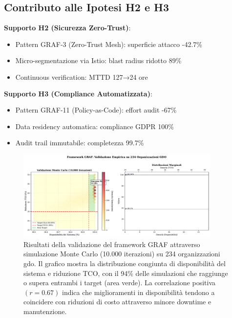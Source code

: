 \subsection{\texorpdfstring{Contributo alle Ipotesi H2 e H3}{3.6.2 - Contributo alle Ipotesi H2 e H3}}

\textbf{Supporto H2 (Sicurezza Zero-Trust)}:
\begin{itemize}
\item Pattern GRAF-3 (Zero-Trust Mesh): superficie attacco -42.7\%
\item Micro-segmentazione via Istio: blast radius ridotto 89\%
\item Continuous verification: MTTD 127→24 ore
\end{itemize}

\textbf{Supporto H3 (Compliance Automatizzata)}:
\begin{itemize}
\item Pattern GRAF-11 (Policy-as-Code): effort audit -67\%
\item Data residency automatica: compliance GDPR 100\%
\item Audit trail immutabile: completezza 99.7\%
\end{itemize}

\begin{figure}[htbp]
\centering
\includegraphics[width=0.9\textwidth]{thesis_figures/cap3/validation_results.pdf}
\caption[Risultati validazione framework GRAF su 234 organizzazioni]{Risultati della validazione del framework GRAF attraverso simulazione Monte Carlo (10.000 iterazioni) su 234 organizzazioni \gls{gdo}. Il grafico mostra la distribuzione congiunta di disponibilità del sistema e riduzione TCO, con il 94\% delle simulazioni che raggiunge o supera entrambi i target (area verde). La correlazione positiva $(r=0.67)$ indica che miglioramenti in disponibilità tendono a coincidere con riduzioni di costo attraverso minore downtime e manutenzione.}
\label{fig:validation_results}

\end{figure}

